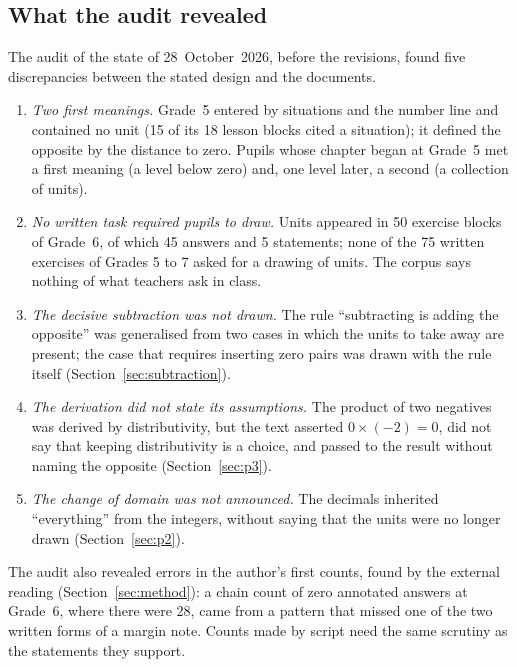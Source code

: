 \documentclass[11pt,a4paper]{article}
\theoremstyle{definition}
\begin{document}
\subsection{What the audit revealed}
The audit of the state of 28~October~2026, before the revisions, found five discrepancies between the stated design and the documents.
\begin{enumerate}[leftmargin=*]
\item \emph{Two first meanings.} Grade~5 entered by situations and the number line and contained no unit (15 of its 18 lesson blocks cited a situation); it defined the opposite by the distance to zero. Pupils whose chapter began at Grade~5 met a first meaning (a level below zero) and, one level later, a second (a collection of units).
\item \emph{No written task required pupils to draw.} Units appeared in 50 exercise blocks of Grade~6, of which 45 answers and 5 statements; none of the 75 written exercises of Grades 5 to 7 asked for a drawing of units. The corpus says nothing of what teachers ask in class.
\item \emph{The decisive subtraction was not drawn.} The rule ``subtracting is adding the opposite'' was generalised from two cases in which the units to take away are present; the case that requires inserting zero pairs was drawn with the rule itself (Section~\ref{sec:subtraction}).
\item \emph{The derivation did not state its assumptions.} The product of two negatives was derived by distributivity, but the text asserted $0\times(-2)=0$, did not say that keeping distributivity is a choice, and passed to the result without naming the opposite (Section~\ref{sec:p3}).
\item \emph{The change of domain was not announced.} The decimals inherited ``everything'' from the integers, without saying that the units were no longer drawn (Section~\ref{sec:p2}).
\end{enumerate}
The audit also revealed errors in the author's first counts, found by the external reading (Section~\ref{sec:method}): a chain count of zero annotated answers at Grade~6, where there were 28, came from a pattern that missed one of the two written forms of a margin note. Counts made by script need the same scrutiny as the statements they support.
\end{document}
